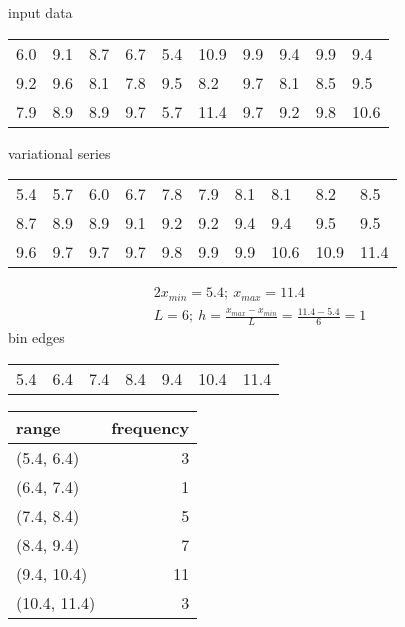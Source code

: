 \documentclass{article}%
\begin{document}
%
\normalsize%
input data%
\begin{longtable}{l l l l l l l l l l }%
6.0&9.1&8.7&6.7&5.4&10.9&9.9&9.4&9.9&9.4\\%
9.2&9.6&8.1&7.8&9.5&8.2&9.7&8.1&8.5&9.5\\%
7.9&8.9&8.9&9.7&5.7&11.4&9.7&9.2&9.8&10.6\\%
\end{longtable}%
variational series%
\begin{longtable}{l l l l l l l l l l }%
5.4&5.7&6.0&6.7&7.8&7.9&8.1&8.1&8.2&8.5\\%
8.7&8.9&8.9&9.1&9.2&9.2&9.4&9.4&9.5&9.5\\%
9.6&9.7&9.7&9.7&9.8&9.9&9.9&10.6&10.9&11.4\\%
\end{longtable}%
\begin{alignat*}{2}%
x_{min} = 5.4; ~ x_{max} = 11.4 \\%
L = 6;
            ~ h = \frac { x_{max} - x_{min} } L
                = \frac { 11.4 - 5.4 } 6
                = 1%
\end{alignat*}%
bin edges%
\begin{longtable}{l l l l l l l }%
5.4&6.4&7.4&8.4&9.4&10.4&11.4\\%
\end{longtable}%
\begin{tabular}{lr}
\toprule
       range &  frequency \\
\midrule
  (5.4, 6.4) &          3 \\
  (6.4, 7.4) &          1 \\
  (7.4, 8.4) &          5 \\
  (8.4, 9.4) &          7 \\
 (9.4, 10.4) &         11 \\
(10.4, 11.4) &          3 \\
\bottomrule
\end{tabular}
%
\end{document}

